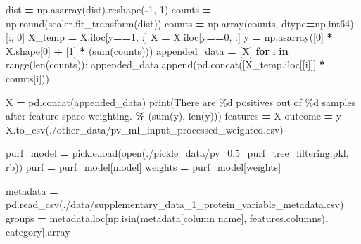 \documentclass[
  11pt,
  oneside]{book}
\newenvironment{Shaded}{\begin{snugshade}}{\end{snugshade}}
\newcommand{\BuiltInTok}[1]{#1}
\newcommand{\ControlFlowTok}[1]{\textcolor[rgb]{0.13,0.29,0.53}{\textbf{#1}}}
\newcommand{\DecValTok}[1]{\textcolor[rgb]{0.00,0.00,0.81}{#1}}
\newcommand{\KeywordTok}[1]{\textcolor[rgb]{0.13,0.29,0.53}{\textbf{#1}}}
\newcommand{\NormalTok}[1]{#1}
\newcommand{\OperatorTok}[1]{\textcolor[rgb]{0.81,0.36,0.00}{\textbf{#1}}}
\newcommand{\SpecialCharTok}[1]{\textcolor[rgb]{0.00,0.00,0.00}{#1}}
\newcommand{\StringTok}[1]{\textcolor[rgb]{0.31,0.60,0.02}{#1}}
\begin{document}
\begin{Shaded}
\begin{Highlighting}[]
\NormalTok{dist }\OperatorTok{=}\NormalTok{ np.asarray(dist).reshape(}\OperatorTok{{-}}\DecValTok{1}\NormalTok{, }\DecValTok{1}\NormalTok{)}
\NormalTok{counts }\OperatorTok{=}\NormalTok{ np.}\BuiltInTok{round}\NormalTok{(scaler.fit\_transform(dist))}
\NormalTok{counts }\OperatorTok{=}\NormalTok{ np.array(counts, dtype}\OperatorTok{=}\NormalTok{np.int64)[:, }\DecValTok{0}\NormalTok{]}
\NormalTok{X\_temp }\OperatorTok{=}\NormalTok{ X.iloc[y}\OperatorTok{==}\DecValTok{1}\NormalTok{, :]}
\NormalTok{X }\OperatorTok{=}\NormalTok{ X.iloc[y}\OperatorTok{==}\DecValTok{0}\NormalTok{, :]}
\NormalTok{y }\OperatorTok{=}\NormalTok{ np.asarray([}\DecValTok{0}\NormalTok{] }\OperatorTok{*}\NormalTok{ X.shape[}\DecValTok{0}\NormalTok{] }\OperatorTok{+}\NormalTok{ [}\DecValTok{1}\NormalTok{] }\OperatorTok{*}\NormalTok{ (}\BuiltInTok{sum}\NormalTok{(counts)))}
\NormalTok{appended\_data }\OperatorTok{=}\NormalTok{ [X]}
\ControlFlowTok{for}\NormalTok{ i }\KeywordTok{in} \BuiltInTok{range}\NormalTok{(}\BuiltInTok{len}\NormalTok{(counts)):}
\NormalTok{    appended\_data.append(pd.concat([X\_temp.iloc[[i]]] }\OperatorTok{*}\NormalTok{ counts[i]))}
    
\NormalTok{X }\OperatorTok{=}\NormalTok{ pd.concat(appended\_data)}
\BuiltInTok{print}\NormalTok{(}\StringTok{\textquotesingle{}There are }\SpecialCharTok{\%d}\StringTok{ positives out of }\SpecialCharTok{\%d}\StringTok{ samples after feature space weighting.\textquotesingle{}} \OperatorTok{\%}\NormalTok{ (}\BuiltInTok{sum}\NormalTok{(y), }\BuiltInTok{len}\NormalTok{(y)))}
\NormalTok{features }\OperatorTok{=}\NormalTok{ X}
\NormalTok{outcome }\OperatorTok{=}\NormalTok{ y}
\NormalTok{X.to\_csv(}\StringTok{\textquotesingle{}./other\_data/pv\_ml\_input\_processed\_weighted.csv\textquotesingle{}}\NormalTok{)}

\NormalTok{purf\_model }\OperatorTok{=}\NormalTok{ pickle.load(}\BuiltInTok{open}\NormalTok{(}\StringTok{\textquotesingle{}./pickle\_data/pv\_0.5\_purf\_tree\_filtering.pkl\textquotesingle{}}\NormalTok{, }\StringTok{\textquotesingle{}rb\textquotesingle{}}\NormalTok{))}
\NormalTok{purf }\OperatorTok{=}\NormalTok{ purf\_model[}\StringTok{\textquotesingle{}model\textquotesingle{}}\NormalTok{]}
\NormalTok{weights }\OperatorTok{=}\NormalTok{ purf\_model[}\StringTok{\textquotesingle{}weights\textquotesingle{}}\NormalTok{]}

\NormalTok{metadata }\OperatorTok{=}\NormalTok{ pd.read\_csv(}\StringTok{\textquotesingle{}./data/supplementary\_data\_1\_protein\_variable\_metadata.csv\textquotesingle{}}\NormalTok{)}
\NormalTok{groups }\OperatorTok{=}\NormalTok{ metadata.loc[np.isin(metadata[}\StringTok{\textquotesingle{}column name\textquotesingle{}}\NormalTok{], features.columns), }\StringTok{\textquotesingle{}category\textquotesingle{}}\NormalTok{].array}


\end{Highlighting}
\end{Shaded}
\end{document}
